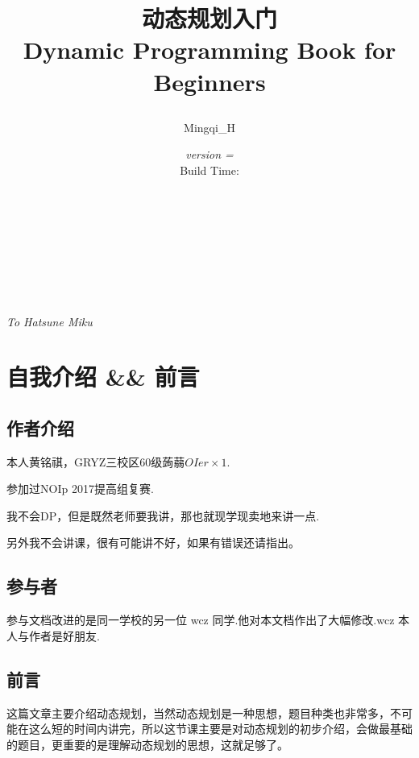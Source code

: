 
\bumprevis
\title{\Huge 动态规划入门\\\Large Dynamic Programming Book for Beginners\\\author{Mingqi\_H}\date{\emph{version = \ver\\}Build Time: \DTMnow}}
\maketitle

\thispagestyle{empty}%
\pagestyle{empty}%

\ \\
\ \\
\ \\
\newpage
\ \\\ \\
\begin{center}\em{\large{To Hatsune Miku}}\end{center}
\newpage
\tableofcontents
\newpage

\pagestyle{plain}%
\setcounter{page}{1}
\setcounter{section}{-1}

\section{自我介绍 \&\& 前言}
\subsection{作者介绍}
本人黄铭祺，GRYZ三校区60级蒟蒻$OIer\times 1$.

参加过NOIp 2017提高组复赛.

我不会DP，但是既然老师要我讲，那也就现学现卖地来讲一点.

另外我不会讲课，很有可能讲不好，如果有错误还请指出。
\subsection{参与者}
参与文档改进的是同一学校的另一位 wcz 同学.他对本文档作出了大幅修改.wcz 本人与作者是好朋友.

\subsection{前言}
这篇文章主要介绍动态规划，当然动态规划是一种思想，题目种类也非常多，不可能在这么短的时间内讲完，所以这节课主要是对动态规划的初步介绍，会做最基础的题目，更重要的是理解动态规划的思想，这就足够了。

